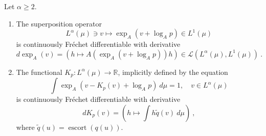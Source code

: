 \documentclass[graybox]{svmult}
\newcommand{\escortof}[1]{\operatorname{escort}\left(#1\right)}
\begin{document}
\begin{proposition}
\label{prop:FAZ} Let $\alpha \geq 2.$
\begin{enumerate}
\item The superposition operator 
\begin{equation*}
L^{\alpha }(\mu )\ni v\mapsto \exp _{A}(v+\log _{A}p)\in L^{1}(\mu )
\end{equation*}
is continuously Fr\'{e}chet differentiable with derivative 
\begin{equation*}
d\exp _{A}(v)=(h\mapsto A(\exp _{A}(v+\log _{A}p))h)\in \mathcal{L}
(L^{\alpha }(\mu ),L^{1}(\mu ))\ .
\end{equation*}
%
\item The functional $K_{p}:L^{\alpha }(\mu )\rightarrow \mathbb{R}$,
implicitly defined by the equation 
\begin{equation*}
\int \exp _{A}(v-K_{p}(v)+\log _{A}p)\ d\mu =1,\quad v\in L^{\alpha }(\mu )
\end{equation*}
is continuously Fr\'{e}chet differentiable with derivative 
\begin{equation*}
dK_{p}(v)=(h\mapsto \int h\widetilde{q}(v)\ d\mu )\ ,
\end{equation*}
where $\widetilde q(u) = \escortof{q(u)}$.
\end{enumerate}
\end{proposition}
%
\end{document}
